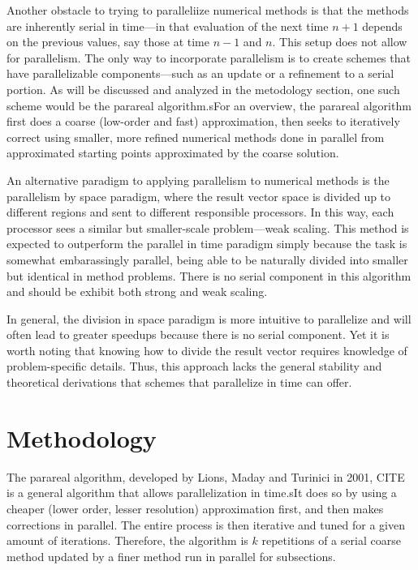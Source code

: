 \documentclass[letterpaper,12pt]{article}
\begin{document}
Another obstacle to trying to paralleliize numerical methods is that the methods
are inherently serial in time---in that evaluation of the next time $n+1$
depends on the previous values, say those at time $n-1$ and $n$. This setup
does not allow for parallelism. The only way to incorporate parallelism is to
create schemes that have parallelizable components---such as an update or a
refinement to a serial portion. As will be discussed and analyzed in the
metodology section, one such scheme would be the parareal algorithm.sFor an
overview, the parareal algorithm first does a coarse (low-order and fast)
approximation, then seeks to iteratively correct using smaller, more refined
numerical methods done in parallel from approximated starting points
approximated by the coarse solution.

An alternative paradigm to applying parallelism to numerical methods is the
parallelism by space paradigm, where the result vector space is divided up to
different regions and sent to different responsible processors. In this way,
each processor sees a similar but smaller-scale problem---weak scaling. This
method is expected to outperform the parallel in time paradigm simply because
the task is somewhat embarassingly parallel, being able to be naturally divided
into smaller but identical in method problems. There is no serial component in
this algorithm and should be exhibit both strong and weak scaling.

In general, the division in space paradigm is more intuitive to parallelize and
will often lead to greater speedups because there is no serial component. Yet
it is worth noting that knowing how to divide the result vector requires
knowledge of problem-specific details. Thus, this approach lacks the
general stability and theoretical derivations that schemes that parallelize in
time can offer.

\section{Methodology}

The parareal algorithm, developed by Lions, Maday and Turinici in 2001, CITE is
a general algorithm that allows parallelization in time.sIt does so by using a
cheaper (lower order, lesser resolution) approximation first, and then makes
corrections in parallel. The entire process is then iterative and tuned for a
given amount of iterations. Therefore, the algorithm is $k$ repetitions of a
serial coarse method updated by a finer method run in parallel for subsections.
\end{document}
